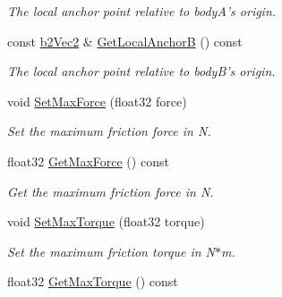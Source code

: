 \begin{DoxyCompactItemize}
\begin{DoxyCompactList}\small\item\em The local anchor point relative to body\-A's origin. \end{DoxyCompactList}\item 
\hypertarget{classb2_friction_joint_acd57698eb559d36eeac6df00dfd8b89f}{const \hyperlink{structb2_vec2}{b2\-Vec2} \& \hyperlink{classb2_friction_joint_acd57698eb559d36eeac6df00dfd8b89f}{Get\-Local\-Anchor\-B} () const }\label{classb2_friction_joint_acd57698eb559d36eeac6df00dfd8b89f}

\begin{DoxyCompactList}\small\item\em The local anchor point relative to body\-B's origin. \end{DoxyCompactList}\item 
\hypertarget{classb2_friction_joint_a7936d852b5ad71dc92efc397865dda41}{void \hyperlink{classb2_friction_joint_a7936d852b5ad71dc92efc397865dda41}{Set\-Max\-Force} (float32 force)}\label{classb2_friction_joint_a7936d852b5ad71dc92efc397865dda41}

\begin{DoxyCompactList}\small\item\em Set the maximum friction force in N. \end{DoxyCompactList}\item 
\hypertarget{classb2_friction_joint_af3abd33af3943197c89375057302fd0d}{float32 \hyperlink{classb2_friction_joint_af3abd33af3943197c89375057302fd0d}{Get\-Max\-Force} () const }\label{classb2_friction_joint_af3abd33af3943197c89375057302fd0d}

\begin{DoxyCompactList}\small\item\em Get the maximum friction force in N. \end{DoxyCompactList}\item 
\hypertarget{classb2_friction_joint_a9e3aaf485dc86a378bb62ee78cea43aa}{void \hyperlink{classb2_friction_joint_a9e3aaf485dc86a378bb62ee78cea43aa}{Set\-Max\-Torque} (float32 torque)}\label{classb2_friction_joint_a9e3aaf485dc86a378bb62ee78cea43aa}

\begin{DoxyCompactList}\small\item\em Set the maximum friction torque in N$\ast$m. \end{DoxyCompactList}\item 
\hypertarget{classb2_friction_joint_ae59d07030bded21f46a6a432553e71c1}{float32 \hyperlink{classb2_friction_joint_ae59d07030bded21f46a6a432553e71c1}{Get\-Max\-Torque} () const }\label{classb2_friction_joint_ae59d07030bded21f46a6a432553e71c1}


\end{DoxyCompactItemize}
